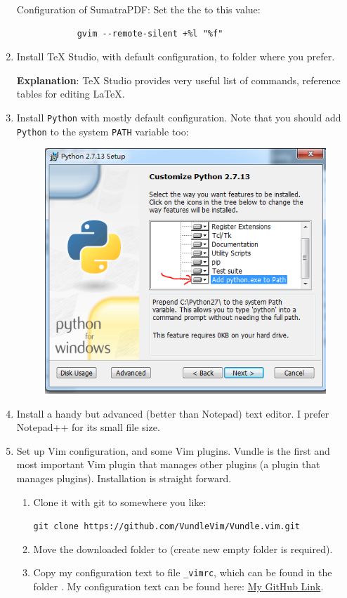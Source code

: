 \documentclass{article}
\begin{document}
\begin{enumerate}
        Configuration of SumatraPDF: \newline
        Set the the  to this value:
        \begin{lstlisting}
            gvim --remote-silent +%l "%f"
        \end{lstlisting}
    \item Install \TeX{} Studio, with default configuration, to folder
        where you prefer. 

        \textbf{Explanation}: \TeX{} Studio provides very useful list
        of commands, reference tables for editing \LaTeX.

    \item Install \texttt{Python} with mostly default configuration. Note
        that you should add \texttt{Python} to the system
        \texttt{PATH} variable too:
        \begin{figure}[H]
            \centering
            \includegraphics[width=0.6\linewidth]{pics/3.PNG}
        \end{figure}

    \item Install a handy but advanced (better than Notepad) text
        editor. I prefer Notepad++ for its small file size.
    \item Set up Vim configuration, and some Vim plugins. Vundle is
        the first and most important Vim plugin that manages other
        plugins (a plugin that manages plugins). Installation is
        straight forward. 
        
        \begin{enumerate}
            \item Clone it with git to somewhere you like:

                \texttt{\footnotesize git clone
                https://github.com/VundleVim/Vundle.vim.git}
            \item Move the downloaded folder to
                 (create new empty folder is required).
            \item  Copy my configuration text to file \texttt{\_vimrc},
                which can be found in the folder . My configuration text can be found here:
                \href{https://github.com/we-taper/vimConfig/blob/master/_vimrc}
                {My GitHub Link}.


\end{enumerate}
\end{enumerate}
\end{document}
